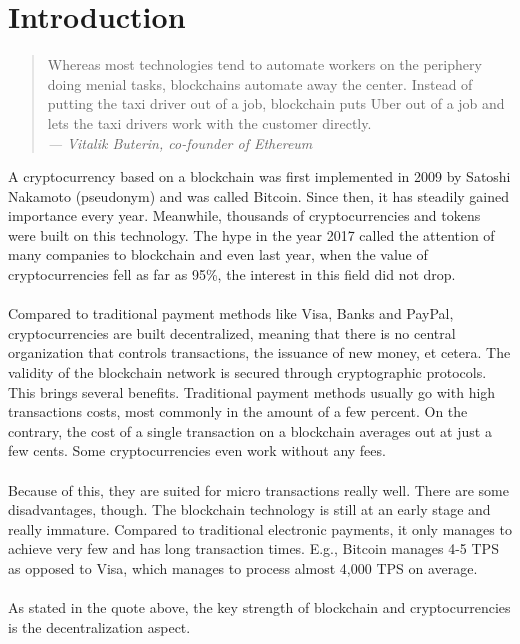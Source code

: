 \section{Introduction}
\begin{quote}
  Whereas most technologies tend to automate workers on the periphery doing menial tasks, blockchains automate away the center. Instead of putting the taxi driver out of a job, blockchain puts Uber out of a job and lets the taxi drivers work with the customer directly.
  \\
  {\textit{— Vitalik Buterin, co-founder of Ethereum}}
\end{quote}

A cryptocurrency based on a blockchain was first implemented in 2009 by Satoshi Nakamoto (pseudonym) and was called Bitcoin.
Since then, it has steadily gained importance every year.
Meanwhile, thousands of cryptocurrencies and tokens were built on this technology.
The hype in the year 2017 called the attention of many companies to blockchain and even last year, when the value of cryptocurrencies fell as far as 95\%, the interest in this field did not drop.
\\\\
Compared to traditional payment methods like Visa, Banks and PayPal, cryptocurrencies are built decentralized, meaning that there is no central organization that controls transactions, the issuance of new money, et cetera.
The validity of the blockchain  network is secured through cryptographic protocols.
This brings several benefits.
Traditional payment methods usually go with high transactions costs, most commonly in the amount of a few percent.
On the contrary, the cost of a single transaction on a blockchain averages out at just a few cents\cite{ethereum-fee}.
Some cryptocurrencies even work without any fees.
\\\\
Because of this, they are suited for micro transactions really well.
There are some disadvantages, though.
The blockchain technology is still at an early stage and really immature.
Compared to traditional electronic payments, it only manages to achieve very few  and has long transaction times.
E.g., Bitcoin manages 4-5 TPS\cite{bitcoinTPS} as opposed to Visa, which manages to process almost 4,000 TPS on average\cite{visa}.
\\\\
As stated in the quote above, the key strength of blockchain and cryptocurrencies is the decentralization aspect.
